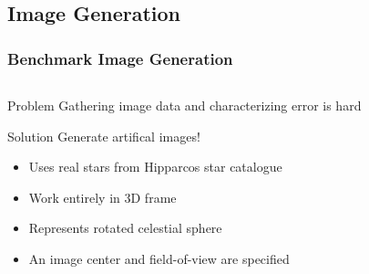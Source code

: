 \documentclass[11pt]{beamer}
\begin{document}
    \subsection{Image Generation}\label{subsec:imageGeneration}
    \begin{frame}
        \frametitle{Benchmark Image Generation}
        \begin{columns}
            \begin{column}{0.5\textwidth}
                \begin{block}{Problem}
                    Gathering image data and characterizing error is hard
                \end{block} \medskip
                \begin{block}{Solution}
                    Generate artifical images!
                    \begin{itemize}
                        \item Uses real stars from Hipparcos star catalogue
                        \item Work entirely in 3D frame
                        \item Represents rotated celestial sphere
                        \item An image center and field-of-view are specified
                    \end{itemize}
                \end{block}
            \end{column}
            \begin{column}{0.5\textwidth}
                \hspace*{-2pt}
            \end{column}
        \end{columns}

    \end{frame}
\end{document}
